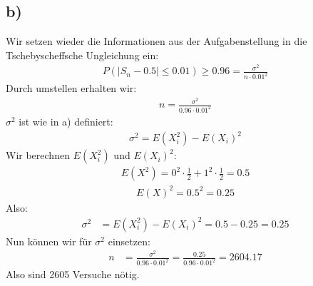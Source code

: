 \subsection*{b)}
Wir setzen wieder die Informationen aus der Aufgabenstellung in die Tschebyscheffsche Ungleichung ein:
\begin{align*}
  P(|S_n - 0.5|\le 0.01) \ge 0.96 = \frac{ \sigma^2 }{n\cdot 0.01^2 }
\end{align*}
Durch umstellen erhalten wir:
\begin{align*}
  n = \frac{ \sigma^2 }{0.96 \cdot 0.01^2 }
\end{align*}
$ \sigma^2 $ ist wie in a) definiert:
\begin{align*}
  \sigma^2 = E(X_i^2) - E(X_i)^2
\end{align*}
Wir berechnen $ E(X_i^2) $ und $ E(X_i)^2 $:
\begin{align*}
  E(X^2) = 0^2 \cdot \frac{ 1 }{ 2 } + 1^2 \cdot \frac{ 1 }{ 2 } = 0.5
\end{align*}
\begin{align*}
  E(X)^2 = 0.5^2 = 0.25
\end{align*}
Also:
\begin{align*}
  \sigma^2 &= E(X_i^2) - E(X_i)^2 = 0.5 - 0.25 = 0.25
\end{align*}
Nun können wir für $ \sigma^2 $ einsetzen:
\begin{align*}
  n &= \frac{ \sigma^2 }{0.96 \cdot 0.01^2 } = \frac{ 0.25 }{0.96 \cdot 0.01^2 } = 2604.17
\end{align*}
Also sind 2605 Versuche nötig.